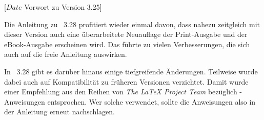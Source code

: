 %
%
%
%
%
%
%
%
%

                 [$Date$
                  Vorwort zu Version 3.25]


Die Anleitung zu \KOMAScript~3.28 profitiert wieder einmal davon, dass nahezu
zeitgleich mit dieser Version auch eine überarbeitete Neuauflage der
Print-Ausgabe \cite{book:komascript} und der eBook-Ausgabe
\cite{ebook:komascript} erscheinen wird. Das führte zu vielen Verbesserungen,
die sich auch auf die freie Anleitung auswirken.

In \KOMAScript~3.28 gibt es darüber hinaus einige tiefgreifende
Änderungen. Teilweise wurde dabei auch auf Kompatibilität zu früheren
Versionen verzichtet. Damit wurde einer Empfehlung aus den Reihen von
\emph{The \LaTeX{} Project Team} bezüglich -Anweisungen
entsprochen. Wer solche verwendet, sollte die Anweisungen also in der
Anleitung erneut nachschlagen.

